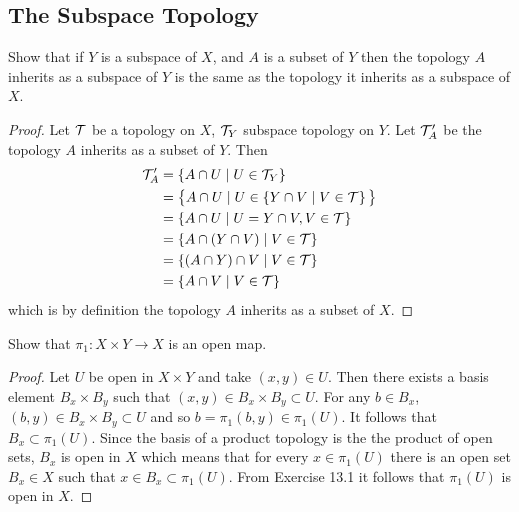 \subsection{The Subspace Topology}
\begin{ex}{16.1}
    Show that if $Y$ is a subspace of $X$, and $A$ is a subset of $Y$ then the topology $A$ inherits as a subspace of $Y$ is the same as the topology it inherits as a subspace of $X$.
\end{ex}
\begin{proof}
    Let $\mathcal{T}$ be a topology on $X$, $\mathcal{T}_Y$ subspace topology on $Y$. Let $\mathcal{T}_A'$ be the topology $A$ inherits as a subset of $Y$.
    Then
    \begin{align*}
        \mathcal{T}_A'&=\left\{A\cap U\mid U\in\mathcal{T}_Y\right\}\\
        &=\big\{A\cap U\mid U\in\left\{Y\cap V\mid V\in \mathcal{T}\right\} \big\}\\
        &=\left\{A\cap U\mid U= Y\cap V, V\in\mathcal{T}\right\}\\
        &=\left\{A\cap\left(Y\cap V\right)\mid V\in\mathcal{T}\right\}\\
        &=\left\{\left(A\cap Y\right)\cap V\mid V\in\mathcal{T}\right\}\\
        &=\left\{A\cap V\mid V\in\mathcal{T}\right\}    
    \end{align*}
    which is by definition the topology $A$ inherits as a subset of $X$.
\end{proof}

\begin{ex}{16.3}
    
\end{ex}

\begin{ex}{16.4}
    Show that $\pi_1:X\times Y\to X$ is an open map.
\end{ex}
\begin{proof}
    Let $U$ be open in $X\times Y$ and take $(x,y)\in U$. Then there exists a basis element $B_x\times B_y$ such that $(x,y)\in B_x\times B_y\subset U$.
    For any $b\in B_x$, $(b,y)\in B_x\times B_y\subset U$ and so $b=\pi_1(b,y)\in \pi_1(U)$. It follows that $B_x\subset\pi_1(U)$.
    Since the basis of a product topology is the the product of open sets, $B_x$ is open in $X$ which means that for every $x\in\pi_1(U)$ there is an open set $B_x\in X$ such that $x\in B_x\subset \pi_1(U)$.
    From Exercise 13.1 it follows that $\pi_1(U)$ is open in $X$.    
\end{proof}


